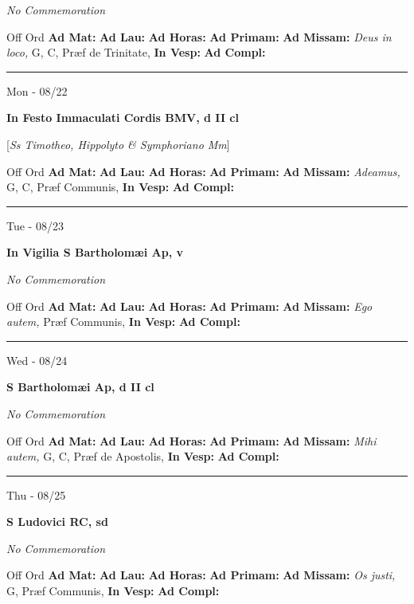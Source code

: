 \documentclass[letterpaper, 10pt]{article}
\begin{document}
\textit{No Commemoration}\begin{justify}
Off Ord
\textbf{Ad Mat: }
\textbf{Ad Lau: }
\textbf{Ad Horas: }
\textbf{Ad Primam: }
\textbf{Ad Missam:} \textit{Deus in loco, } G, C, Præf de Trinitate, 
\textbf{In Vesp: }
\textbf{Ad Compl: }\end{justify}



\hrule
\begin{center}
Mon - 08/22
\end{center}\textbf{ \large In Festo Immaculati Cordis BMV, \textnormal{\normalsize d II cl}}

[\textit{Ss Timotheo, Hippolyto \& Symphoriano Mm}]
\begin{justify}
Off Ord
\textbf{Ad Mat: }
\textbf{Ad Lau: }
\textbf{Ad Horas: }
\textbf{Ad Primam: }
\textbf{Ad Missam:} \textit{Adeamus, } G, C, Præf Communis, 
\textbf{In Vesp: }
\textbf{Ad Compl: }\end{justify}



\hrule
\begin{center}
Tue - 08/23
\end{center}\textbf{ \large In Vigilia S Bartholomæi Ap, \textnormal{\normalsize v}}

\textit{No Commemoration}\begin{justify}
Off Ord
\textbf{Ad Mat: }
\textbf{Ad Lau: }
\textbf{Ad Horas: }
\textbf{Ad Primam: }
\textbf{Ad Missam:} \textit{Ego autem, } Præf Communis, 
\textbf{In Vesp: }
\textbf{Ad Compl: }\end{justify}



\hrule
\begin{center}
Wed - 08/24
\end{center}\textbf{ \large S Bartholomæi Ap, \textnormal{\normalsize d II cl}}

\textit{No Commemoration}\begin{justify}
Off Ord
\textbf{Ad Mat: }
\textbf{Ad Lau: }
\textbf{Ad Horas: }
\textbf{Ad Primam: }
\textbf{Ad Missam:} \textit{Mihi autem, } G, C, Præf de Apostolis, 
\textbf{In Vesp: }
\textbf{Ad Compl: }\end{justify}



\hrule
\begin{center}
Thu - 08/25
\end{center}\textbf{ \large S Ludovici RC, \textnormal{\normalsize sd}}

\textit{No Commemoration}\begin{justify}
Off Ord
\textbf{Ad Mat: }
\textbf{Ad Lau: }
\textbf{Ad Horas: }
\textbf{Ad Primam: }
\textbf{Ad Missam:} \textit{Os justi, } G, Præf Communis, 
\textbf{In Vesp: }
\textbf{Ad Compl: }\end{justify}
\end{document}
